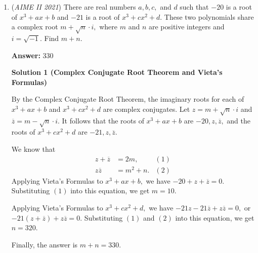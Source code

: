 \begin{enumerate}
 Now using the number $1,2,4,5,$ we take two to get a number divisible by $3$ for $(x_2 + x_5):$
 \begin{align*} 1+5 &\equiv 0 \pmod{3}, \\ 4+2 &\equiv 0 \pmod{3}, \\ 4+5 &\equiv 0 \pmod{3}, \\ 1+2 &\equiv 0 \pmod{3}. \end{align*}
We have $4$ possibilities from above. Since we can also have $5+1$ or $2+4,$ there are $4\cdot2=8$ possibilities in all.

 Now using 
 \[(x_2 + x_5)(x_3x_4) \equiv 0 \pmod{3},\] we have $(x_3x_4),$ which results in $8$ more possibilities of $2$ times more. So, we get $2\cdot2\cdot4=16.$

 Remember that $3$ can be any of $5$ different variables. So, we multiply by $5$ to get the answer $\boxed{080}.$



	\item (\textit{AIME II 2021}) There are real numbers $a, b, c,$ and $d$ such that $-20$ is a root of $x^3 + ax + b$ and $-21$ is a root of $x^3 + cx^2 + d.$ These two polynomials share a complex root $m + \sqrt{n} \cdot i,$ where $m$ and $n$ are positive integers and $i = \sqrt{-1}.$ Find $m+n.$

 \textbf{Answer: }330



\textbf{Solution 1 (Complex Conjugate Root Theorem and Vieta's Formulas)}

By the Complex Conjugate Root Theorem, the imaginary roots for each of $x^3+ax+b$ and $x^3+cx^2+d$ are complex conjugates. Let $z=m+\sqrt{n}\cdot i$ and $\overline{z}=m-\sqrt{n}\cdot i.$ It follows that the roots of $x^3+ax+b$ are $-20,z,\overline{z},$ and the roots of $x^3+cx^2+d$ are $-21,z,\overline{z}.$

 We know that
 \begin{align*} z+\overline{z}&=2m, & (1) \\ z\overline{z}&=m^2+n. & (2) \end{align*}
Applying Vieta's Formulas to $x^3+ax+b,$ we have $-20+z+\overline{z}=0.$ Substituting $(1)$ into this equation, we get $m=10.$

 Applying Vieta's Formulas to $x^3+cx^2+d,$ we have $-21z-21\overline{z}+z\overline{z}=0,$ or $-21(z+\overline{z})+z\overline{z}=0.$ Substituting $(1)$ and $(2)$ into this equation, we get $n=320.$

 Finally, the answer is $m+n=\boxed{330}.$





\end{enumerate}
